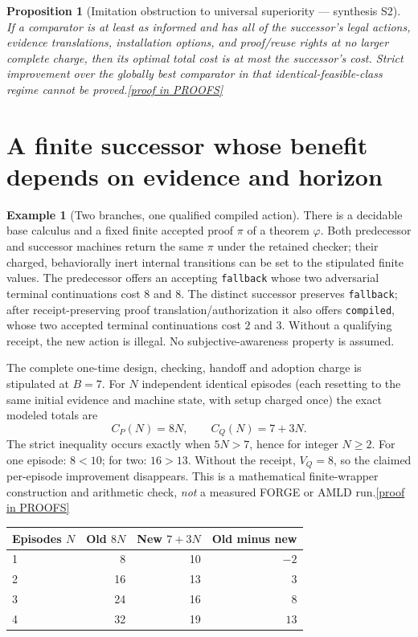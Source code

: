 \documentclass[11pt,letterpaper]{article}
\newtheorem{proposition}[theorem]{Proposition}
\theoremstyle{definition}
\newtheorem{example}[theorem]{Example}
\theoremstyle{remark}
\newcommand{\prooflink}[1]{\hfill\hyperlink{proof:#1}{\footnotesize[proof in PROOFS]}}
\begin{document}
\begin{proposition}[Imitation obstruction to universal superiority --- synthesis S2]\label{prop:imitate}\hypertarget{claim:imitate}{}
If a comparator is at least as informed and has all of the successor's legal actions, evidence translations, installation options, and proof/reuse rights at no larger complete charge, then its optimal total cost is at most the successor's cost. Strict improvement over the globally best comparator in that identical-feasible-class regime cannot be proved.\prooflink{imitate}
\end{proposition}

\section{A finite successor whose benefit depends on evidence and horizon}
\begin{example}[Two branches, one qualified compiled action]\label{ex:two}\hypertarget{claim:two}{}
There is a decidable base calculus and a fixed finite accepted proof $\pi$ of a theorem $\varphi$. Both predecessor and successor machines return the same $\pi$ under the retained checker; their charged, behaviorally inert internal transitions can be set to the stipulated finite values. The predecessor offers an accepting \texttt{fallback} whose two adversarial terminal continuations cost $8$ and $8$. The distinct successor preserves \texttt{fallback}; after receipt-preserving proof translation/authorization it also offers \texttt{compiled}, whose two accepted terminal continuations cost $2$ and $3$. Without a qualifying receipt, the new action is illegal. No subjective-awareness property is assumed.

The complete one-time design, checking, handoff and adoption charge is stipulated at $B=7$. For $N$ independent identical episodes (each resetting to the same initial evidence and machine state, with setup charged once) the exact modeled totals are
\[
 C_{P}(N)=8N,\qquad C_Q(N)=7+3N.
\]
The strict inequality occurs exactly when $5N>7$, hence for integer $N\geq2$. For one episode: $8<10$; for two: $16>13$. Without the receipt, $V_Q=8$, so the claimed per-episode improvement disappears. This is a mathematical finite-wrapper construction and arithmetic check, \emph{not} a measured FORGE or AMLD run.\prooflink{two}
\end{example}

\begin{center}\small
\begin{tabular}{lrrr}\toprule
Episodes $N$ & Old $8N$ & New $7+3N$ & Old minus new\\\midrule
1 & 8 & 10 & $-2$\\
2 & 16 & 13 & $3$\\
3 & 24 & 16 & $8$\\
4 & 32 & 19 & $13$\\\bottomrule
\end{tabular}\end{center}
\end{document}
